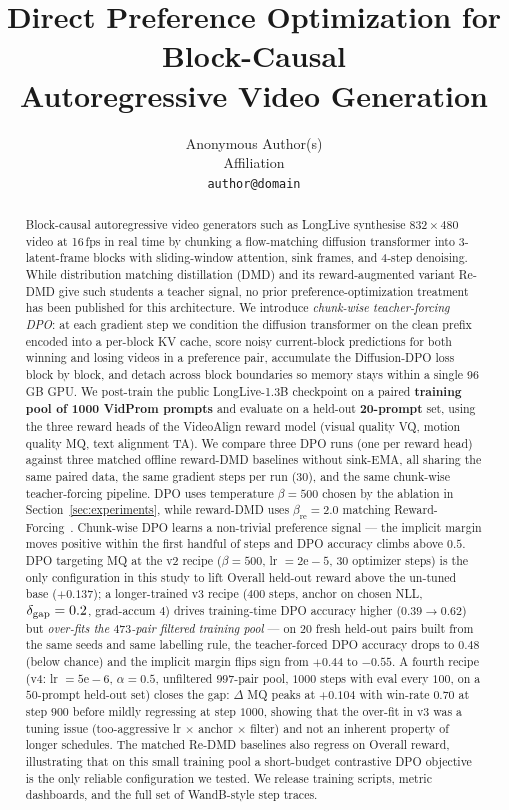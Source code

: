 \documentclass{article}
\title{Direct Preference Optimization for Block-Causal \\ Autoregressive Video Generation}
\author{
Anonymous Author(s) \\
Affiliation \\
\texttt{author@domain}
}
\begin{document}
\maketitle

\begin{abstract}
Block-causal autoregressive video generators such as LongLive synthesise $832\!\times\!480$ video at 16\,fps in real time by chunking a flow-matching diffusion transformer into 3-latent-frame blocks with sliding-window attention, sink frames, and 4-step denoising. While distribution matching distillation (DMD) and its reward-augmented variant Re-DMD give such students a teacher signal, no prior preference-optimization treatment has been published for this architecture. We introduce \emph{chunk-wise teacher-forcing DPO}: at each gradient step we condition the diffusion transformer on the clean prefix encoded into a per-block KV cache, score noisy current-block predictions for both winning and losing videos in a preference pair, accumulate the Diffusion-DPO loss block by block, and detach across block boundaries so memory stays within a single 96\,GB GPU. We post-train the public LongLive-1.3B checkpoint on a paired \textbf{training pool of 1000 VidProm prompts} and evaluate on a held-out \textbf{20-prompt} set, using the three reward heads of the VideoAlign reward model (visual quality VQ, motion quality MQ, text alignment TA). We compare three DPO runs (one per reward head) against three matched offline reward-DMD baselines without sink-EMA, all sharing the same paired data, the same gradient steps per run (30), and the same chunk-wise teacher-forcing pipeline. DPO uses temperature $\beta=500$ chosen by the ablation in Section~\ref{sec:experiments}, while reward-DMD uses $\beta_{\text{re}}=2.0$ matching Reward-Forcing~\cite{lu2025rewardforcing}. Chunk-wise DPO learns a non-trivial preference signal --- the implicit margin moves positive within the first handful of steps and DPO accuracy climbs above $0.5$. DPO targeting MQ at the v2 recipe ($\beta=500$, lr $=2\mathrm{e}{-}5$, $30$ optimizer steps) is the only configuration in this study to lift Overall held-out reward above the un-tuned base ($+0.137$); a longer-trained v3 recipe ($400$ steps, anchor on chosen NLL, $\delta_{\rm gap}=0.2$, grad-accum $4$) drives training-time DPO accuracy higher ($0.39\to0.62$) but \emph{over-fits the $473$-pair filtered training pool} --- on $20$ fresh held-out pairs built from the same seeds and same labelling rule, the teacher-forced DPO accuracy drops to $0.48$ (below chance) and the implicit margin flips sign from $+0.44$ to $-0.55$. A fourth recipe (v4: lr $=5\mathrm{e}{-}6$, $\alpha=0.5$, unfiltered $997$-pair pool, $1000$ steps with eval every $100$, on a $50$-prompt held-out set) closes the gap: $\Delta$ MQ peaks at $+0.104$ with win-rate $0.70$ at step $900$ before mildly regressing at step $1000$, showing that the over-fit in v3 was a tuning issue (too-aggressive lr $\times$ anchor $\times$ filter) and not an inherent property of longer schedules. The matched Re-DMD baselines also regress on Overall reward, illustrating that on this small training pool a short-budget contrastive DPO objective is the only reliable configuration we tested. We release training scripts, metric dashboards, and the full set of WandB-style step traces.

\end{abstract}
\end{document}
